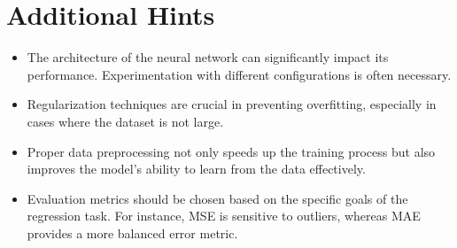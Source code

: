 \documentclass{article}
\begin{document}
\vspace{1cm}
\section*{Additional Hints}
\begin{itemize}
    \item The architecture of the neural network can significantly impact its performance. Experimentation with different configurations is often necessary.
    \item Regularization techniques are crucial in preventing overfitting, especially in cases where the dataset is not large.
    \item Proper data preprocessing not only speeds up the training process but also improves the model's ability to learn from the data effectively.
    \item Evaluation metrics should be chosen based on the specific goals of the regression task. For instance, MSE is sensitive to outliers, whereas MAE provides a more balanced error metric.
\end{itemize}
\end{document}
